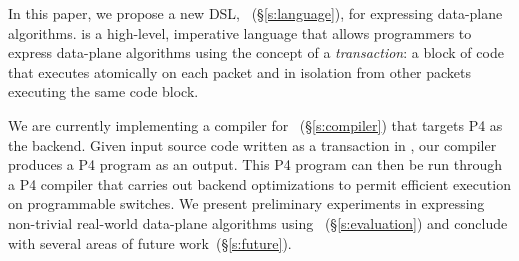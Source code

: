 In this paper, we propose a new DSL, \pktlanguage~(\S\ref{s:language}), for
expressing data-plane algorithms. \pktlanguage is a high-level, imperative
language that allows programmers to express data-plane algorithms using the
concept of a {\em transaction}: a block of code that executes atomically on
each packet and in isolation from other packets executing the same code block.


%

We are currently implementing a compiler for \pktlanguage~(\S\ref{s:compiler})
that targets P4 as the backend. Given input source code written as a
transaction in \pktlanguage, our compiler produces a P4 program as an output.
This P4 program can then be run through a P4 compiler that carries out backend
optimizations to permit efficient execution on programmable switches.  We
present preliminary experiments in expressing non-trivial real-world data-plane
algorithms using \pktlanguage~(\S\ref{s:evaluation}) and conclude with several
areas of future work~(\S\ref{s:future}).
